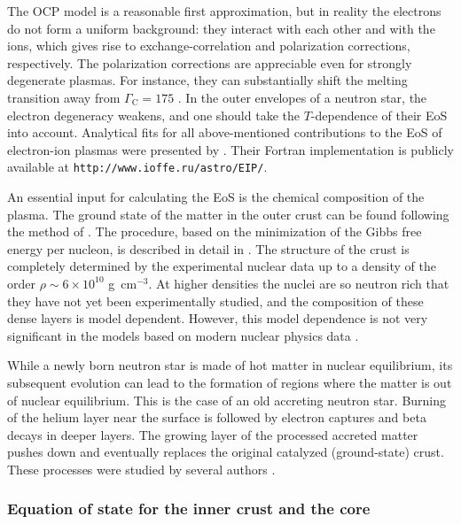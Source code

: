 \documentclass[smallextended]{svjour3}       %
\newcounter{count}
\newcommand{\Gami}{\Gamma_{\mathrm{C}}}
\newcommand{\gcc}{\mbox{g~cm$^{-3}$}}
\begin{document}
The OCP model is a reasonable first approximation, but in
reality the electrons do not form a uniform background: they
interact with each other and with the ions, which gives rise
to exchange-correlation and polarization corrections,
respectively. The polarization corrections are appreciable
even for strongly degenerate plasmas. For instance, they
can substantially shift the melting transition away from
$\Gami=175$ \citep{PC13}. In the outer envelopes
of a neutron star, the electron degeneracy weakens, and one
should take the $T$-dependence of their EoS into account.
Analytical fits for all above-mentioned contributions to the
EoS of electron-ion plasmas were presented by
\citet{PC10,PC13}.
Their Fortran implementation is publicly available at
\texttt{http://www.ioffe.ru/astro/EIP/}.

An essential input for calculating the EoS is the chemical
composition of the plasma. The ground state of the matter in
the outer crust can be found following the method of
\citet{BPS}. The procedure, based on the minimization of the
Gibbs free energy per nucleon, is described in detail in
\citet{HPY07}. The structure of the crust is completely
determined by the experimental nuclear data up to a density
of the order $\rho\sim6\times10^{10}$ \gcc. At higher
densities the nuclei are so neutron rich that they have not
yet been experimentally studied, and the composition of
these dense layers is model dependent. However, this model
dependence is not very significant in the models based on
modern nuclear physics data
\citep{HP94,RuesterHSB06,PearsonGC11}.

While a newly born neutron star is made of hot matter in
nuclear equilibrium, its  subsequent evolution can lead to
the formation of regions where the matter is out of nuclear
equilibrium. This is the case of an old accreting neutron
star. Burning of the helium layer near the surface is
followed by electron captures and beta decays in deeper
layers. The growing layer of the processed accreted matter
pushes down and eventually replaces the original catalyzed
(ground-state) crust. These processes were studied by
several authors \citep[see][and references therein]{HZ90,HZ08}.

\subsubsection{Equation of state for the inner crust and the core}
\label{sect:EOScore}
\end{document}
